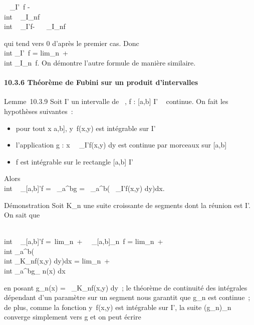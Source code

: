 \documentclass[]{article}
\begin{document}
\left \int ~
\int  _I\timesI'~f -\\int
 \int ~
_I\timesK_nf\right
\leq\int  \\int ~
_I\timesI'f-\int ~
\int ~
_I\timesK_nf

qui tend vers 0 d'après le premier cas. Donc \\int
 \int  _I\timesI'~f
= lim_n\rightarrow~+\infty~~\\int
 \int  _I\timesK_n~f. On démontre
l'autre formule de manière similaire.

\paragraph{10.3.6 Théorème de Fubini sur un produit d'intervalles}

Lemme~10.3.9 Soit I' un intervalle de ~, f : {[}a,b{]} \times I' \rightarrow~ 
continue. On fait les hypothèses suivantes~:

\begin{itemize}
\itemsep1pt\parskip0pt
\item
  pour tout x \in {[}a,b{]}, y\mapsto~f(x,y) est
  intégrable sur I'
\item
  l'application g :
  x\mapsto~\int ~
  _I'f(x,y) dy est continue par morceaux sur {[}a,b{]}
\item
  f est intégrable sur le rectangle {[}a,b{]} \times I'
\end{itemize}

Alors \int  \\int ~
_{[}a,b{]}\timesI'f =\int ~
_a^bg =\int ~
_a^b\left (\int ~
_I'f(x,y) dy\right )dx.

Démonstration Soit K_n une suite croissante de segments dont la
réunion est I'. On sait que

\int  \\int ~
_{[}a,b{]}\timesI'f =\
lim_n\rightarrow~+\infty~\int ~
\int  _{[}a,b{]}\timesK_n~f
= lim_n\rightarrow~+\infty~~\\int
 _a^b\left (\\int
 _K_nf(x,y) dy\right )dx
= lim_n\rightarrow~+\infty~~\\int
 _a^bg_ n(x) dx

en posant g_n(x) =\int ~
_K_nf(x,y) dy~; le théorème de continuité des intégrales
dépendant d'un paramètre sur un segment nous garantit que g_n
est continue~; de plus, comme la fonction
y\mapsto~f(x,y) est intégrable sur I', la suite
(g_n)_n\in{}~ converge simplement vers g et on peut écrire
\end{document}

